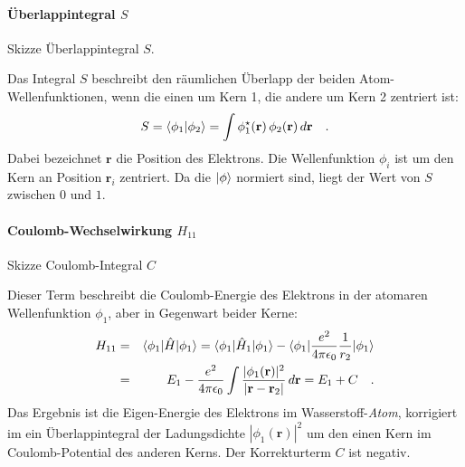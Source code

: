 \paragraph{Überlappintegral $S$} 
\begin{marginfigure}
\caption{Skizze   Überlappintegral $S$. }
\end{marginfigure}
%
Das Integral $S$ beschreibt den räumlichen Überlapp der beiden Atom-Wellenfunktionen, wenn die einen um Kern 1, die andere um Kern 2 zentriert ist:
\begin{equation}
 S = \braket{\phi_1 | \phi_2} = \int \phi_1^\star( \mathbf{r} )  \, \phi_2( \mathbf{r})   \, d\mathbf{r} \quad .
\end{equation}
Dabei bezeichnet $\mathbf{r}$ die Position des Elektrons. Die Wellenfunktion $\phi_i$ ist um den Kern an Position $\mathbf{r}_{i}$ zentriert. Da die $\ket{\phi}$ normiert sind, liegt der Wert von $S$ zwischen $0$ und $1$.





\paragraph{Coulomb-Wechselwirkung $H_{11}$}  
\begin{marginfigure}
\caption{Skizze Coulomb-Integral $C$ }
\end{marginfigure}
%
Dieser Term beschreibt die Coulomb-Energie des Elektrons in der atomaren Wellenfunktion $\phi_1$, aber in Gegenwart beider Kerne:
\begin{eqnarray}
H_{11} &= &  \braket{\phi_1 | \hat{H} | \phi_1} = \braket{\phi_1 | \hat{H}_1 | \phi_1}  - \braket{\phi_1 |  \frac{e^2}{4 \pi \epsilon_0} \frac{1}{r_{2}} | \phi_1}  \\
 & = & E_1 - \frac{e^2}{4 \pi \epsilon_0} \int \frac{|\phi_1(\mathbf{r})|^2 }{|\mathbf{r} - \mathbf{r}_2  |} \, d\mathbf{r} = E_1 + C \quad .
\end{eqnarray} 
Das Ergebnis ist die Eigen-Energie des Elektrons im Wasserstoff-\emph{Atom}, korrigiert im ein Überlappintegral der Ladungsdichte ${|\phi_1(\mathbf{r})|^2 }$ um den einen Kern im Coulomb-Potential des anderen Kerns. Der Korrekturterm $C$ ist negativ.




